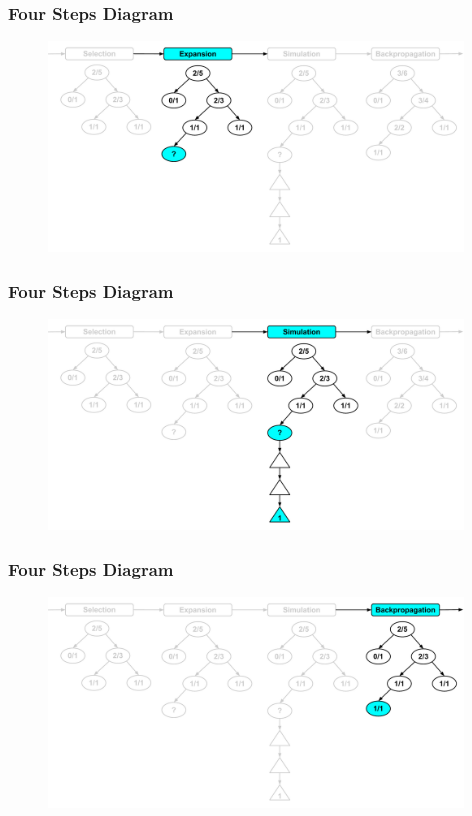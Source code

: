 \documentclass{beamer}
\begin{document}
\begin{frame}[fragile]
\frametitle{Four Steps Diagram}
\begin{figure}[h]
	\includegraphics[width=11cm]{Diagrams/FourSteps/MCTSFourStepProcessTwo.pdf}
	\centering
\end{figure}
\end{frame}

\begin{frame}[fragile]
\frametitle{Four Steps Diagram}
\begin{figure}[h]
	\includegraphics[width=11cm]{Diagrams/FourSteps/MCTSFourStepProcessThree.pdf}
	\centering
\end{figure}
\end{frame}

\begin{frame}[fragile]
\frametitle{Four Steps Diagram}
\begin{figure}[h]
	\includegraphics[width=11cm]{Diagrams/FourSteps/MCTSFourStepProcessFourOne.pdf}
	\centering
\end{figure}
\end{frame}
\end{document}
